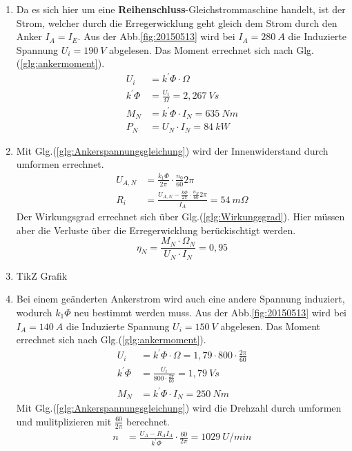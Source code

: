 \begin{solution}
\begin{enumerate}
\item Da es sich hier um eine \textbf{Reihenschluss}-Gleichstrommaschine handelt, ist der Strom, welcher durch die Erregerwicklung geht gleich dem Strom durch den Anker $I_A=I_E$. Aus der Abb.\ref{fig:20150513} wird bei $I_A= 280~A$ die Induzierte Spannung $U_i= 190~V$ abgelesen. Das Moment errechnet sich nach Glg.(\ref{glg:ankermoment}).
\begin{align}
U_i &= k^{'} \Phi \cdot \Omega\\
k^{'} \Phi &= \frac{U_i}{\Omega} = 2,267~Vs\\
M_N &= k^{'} \Phi \cdot I_N = 635~Nm\\
P_N &= U_N \cdot I_N =  84~kW
\end{align}
\item Mit Glg.(\ref{glg:Ankerspannungsgleichung}) wird der Innenwiderstand durch umformen errechnet.\\
\begin{align}
U_{A,N} &= \frac{k_1 \Phi}{2 \pi} \cdot \frac{n_0}{60} 2 \pi\\
R_i &= \frac{U_{A,N} - \frac{k \Phi}{2 \pi} \cdot \frac{n_N}{60} 2 \pi}{I_A}=54~m \Omega
\end{align}
Der Wirkungsgrad errechnet sich über Glg.(\ref{glg:Wirkungsgrad}). Hier müssen aber die Verluste über die Erregerwicklung berückischtigt werden.
\begin{equation}
\eta_N = \frac{M_N \cdot \Omega_N}{U_N \cdot I_N} =0,95
\end{equation}
\item TikZ Grafik
\item Bei einem geänderten Ankerstrom wird auch eine andere Spannung induziert, wodurch $k_1 \Phi$ neu bestimmt werden muss. Aus der Abb.\ref{fig:20150513} wird bei $I_A= 140~A$ die Induzierte Spannung $U_i= 150~V$ abgelesen. Das Moment errechnet sich nach Glg.(\ref{glg:ankermoment}).
\begin{align}
	U_i &= k^{'} \Phi \cdot \Omega = 1,79 \cdot 800 \cdot \frac{2 \pi}{60}\\
	k^{'} \Phi &= \frac{U_i}{800 \cdot \frac{2 \pi}{60}} = 1,79~Vs\\
M_N &= k^{'} \Phi \cdot I_N = 250~Nm
\end{align}
Mit Glg.(\ref{glg:Ankerspannungsgleichung}) wird die Drehzahl durch umformen und mulitplizieren mit $\frac{60}{2 \pi}$ berechnet.
\begin{align}
n&= \frac{U_A - R_A I_A}{k^{'} \Phi} \cdot \frac{60}{2 \pi} = 1029~U/min

\end{align}
\end{enumerate}
\end{solution}
